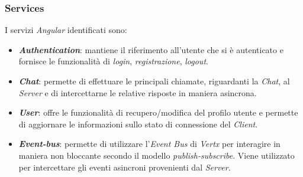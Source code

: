 \subsubsection{Services}
I servizi \textit{Angular} identificati sono:
\begin{itemize}
    \item \textit{\textbf{Authentication}}: mantiene il riferimento all'utente che si è autenticato e fornisce le funzionalità di \textit{login}, \textit{registrazione}, \textit{logout}.
    \item \textit{\textbf{Chat}}: permette di effettuare le principali chiamate, riguardanti la \textit{Chat}, al \textit{Server} e di intercettarne le relative risposte in maniera asincrona. 
    \item \textit{\textbf{User}}: offre le funzionalità di recupero/modifica del profilo utente e permette di aggiornare le informazioni sullo stato di connessione del \textit{Client}.
    \item \textit{\textbf{Event-bus}}: permette di utilizzare l'\textit{Event Bus} di \textit{Vertx} per interagire in maniera non bloccante secondo il modello \textit{publish-subscribe}. Viene utilizzato per intercettare gli eventi asincroni provenienti dal \textit{Server}. 
\end{itemize}

